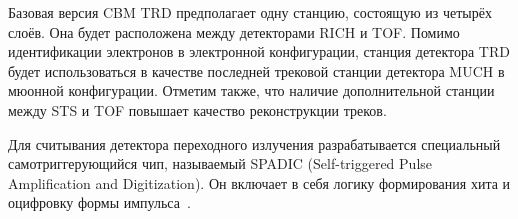 Базовая версия CBM TRD предполагает одну станцию, состоящую из четырёх слоёв. Она будет расположена между детекторами RICH и TOF. Помимо идентификации электронов в электронной конфигурации, станция детектора TRD будет использоваться в качестве последней трековой станции детектора MUCH в мюонной конфигурации. Отметим также, что наличие дополнительной станции между STS и TOF повышает качество реконструкции треков.


Для считывания детектора переходного излучения разрабатывается специальный самотриггерующийся чип, называемый SPADIC (Self-triggered Pulse Amplification and Digitization). Он включает в себя логику формирования хита и оцифровку формы импульса~\cite{SPADIC}.

